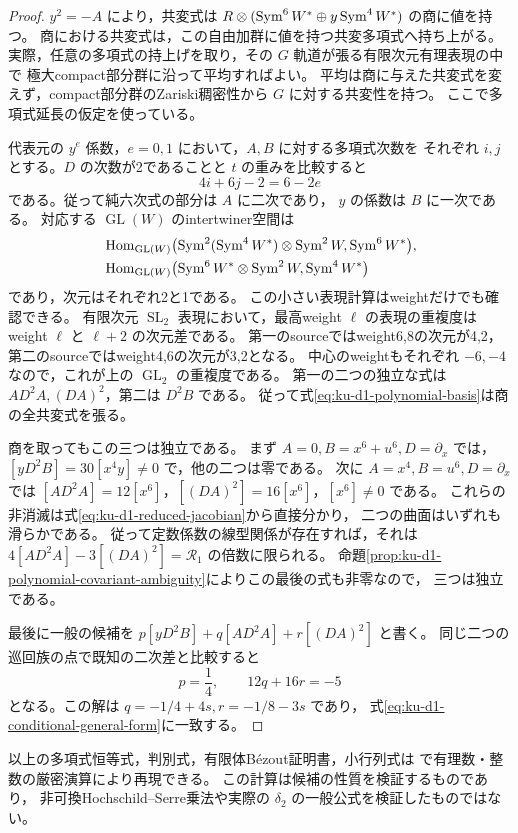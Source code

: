 \begin{proof}
$y^2=-A$ により，共変式は
$R\otimes(\operatorname{Sym}^6W^*\oplus y\operatorname{Sym}^4W^*)$ の商に値を持つ。
商における共変式は，この自由加群に値を持つ共変多項式へ持ち上がる。
実際，任意の多項式の持上げを取り，その $G$ 軌道が張る有限次元有理表現の中で
極大compact部分群に沿って平均すればよい。
平均は商に与えた共変式を変えず，compact部分群のZariski稠密性から
$G$ に対する共変性を持つ。
ここで多項式延長の仮定を使っている。

代表元の $y^e$ 係数，$e=0,1$ において，$A,B$ に対する多項式次数を
それぞれ $i,j$ とする。$D$ の次数が2であることと $t$ の重みを比較すると
\[
                       4i+6j-2=6-2e
\]
である。従って純六次式の部分は $A$ に二次であり，
$y$ の係数は $B$ に一次である。
対応する $\operatorname{GL}(W)$ のintertwiner空間は
\[
 \begin{split}
 &\operatorname{Hom}_{\operatorname{GL}(W)}
   \bigl(\operatorname{Sym}^2(\operatorname{Sym}^4W^*)\otimes\operatorname{Sym}^2W,\operatorname{Sym}^6W^*\bigr),\\
 &\operatorname{Hom}_{\operatorname{GL}(W)}
   \bigl(\operatorname{Sym}^6W^*\otimes\operatorname{Sym}^2W,\operatorname{Sym}^4W^*\bigr)
 \end{split}
\]
であり，次元はそれぞれ2と1である。
この小さい表現計算はweightだけでも確認できる。
有限次元 $\operatorname{SL}_2$ 表現において，最高weight $\ell$ の表現の重複度は
weight $\ell$ と $\ell+2$ の次元差である。
第一のsourceではweight6,8の次元が4,2，
第二のsourceではweight4,6の次元が3,2となる。
中心のweightもそれぞれ $-6,-4$ なので，これが上の
$\operatorname{GL}_2$ の重複度である。
第一の二つの独立な式は $A D^2A,(DA)^2$，第二は $D^2B$ である。
従って式\eqref{eq:ku-d1-polynomial-basis}は商の全共変式を張る。

商を取ってもこの三つは独立である。
まず $A=0,B=x^6+u^6,D=\partial_x$ では，
$[yD^2B]=30[x^4y]\ne0$ で，他の二つは零である。
次に $A=x^4,B=u^6,D=\partial_x$ では
$[A D^2A]=12[x^6]$，$[(DA)^2]=16[x^6]$，$[x^6]\ne0$ である。
これらの非消滅は式\eqref{eq:ku-d1-reduced-jacobian}から直接分かり，
二つの曲面はいずれも滑らかである。
従って定数係数の線型関係が存在すれば，それは
$4[A D^2A]-3[(DA)^2]=\mathcal R_1$ の倍数に限られる。
命題\ref{prop:ku-d1-polynomial-covariant-ambiguity}によりこの最後の式も非零なので，
三つは独立である。

最後に一般の候補を $p[yD^2B]+q[A D^2A]+r[(DA)^2]$ と書く。
同じ二つの巡回族の点で既知の二次差と比較すると
\[
                             p=\frac14,\qquad12q+16r=-5
\]
となる。この解は
$q=-1/4+4s,r=-1/8-3s$ であり，
式\eqref{eq:ku-d1-conditional-general-form}に一致する。
\end{proof}

以上の多項式恒等式，判別式，有限体B\'ezout証明書，小行列式は
で有理数・整数の厳密演算により再現できる。
この計算は候補の性質を検証するものであり，
非可換Hochschild--Serre乗法や実際の $\delta_2$ の一般公式を検証したものではない。
